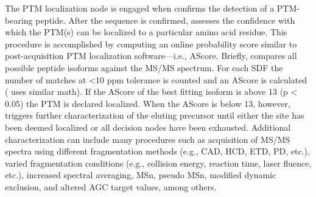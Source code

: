 The PTM localization node is engaged when \inseq{} confirms the detection of a PTM-bearing peptide. After the sequence is confirmed, \inseq{} assesses the confidence with which the PTM(s) can be localized to a particular amino acid residue. This procedure is accomplished by computing an online probability score similar to post-acquisition PTM localization software---i.e., AScore.\cite{ascore} Briefly, \inseq{} compares all possible peptide isoforms against the MS/MS spectrum. For each SDF the number of matches at <10 ppm tolerance is counted and an AScore is calculated (\inseq{} uses similar math). If the AScore of the best fitting isoform is above 13 (p < 0.05) the PTM is declared localized. When the AScore is below 13, however, \inseq{} triggers further characterization of the eluting precursor until either the site has been deemed localized or all decision nodes have been exhausted. Additional characterization can include many procedures such as acquisition of MS/MS spectra using different fragmentation methods (e.g., CAD, HCD, ETD, PD, etc.), varied fragmentation conditions (e.g., collision energy, reaction time, laser fluence, etc.), increased spectral averaging, MSn, pseudo MSn, modified dynamic exclusion, and altered AGC target values, among others.\cite{neutralloss}
